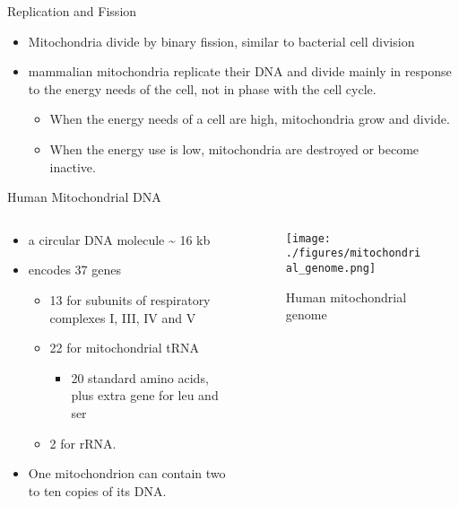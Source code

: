 \documentclass[presentation, smaller]{beamer}
\begin{document}
\begin{frame}[label={sec:org6eeccd4}]{Replication and Fission}
\begin{itemize}
\item Mitochondria divide by binary fission, similar to bacterial cell division

\item mammalian mitochondria replicate their DNA and divide mainly in response
to the energy needs of the cell, not in phase with the cell cycle.
\begin{itemize}
\item When the energy needs of a cell are high, mitochondria grow and
divide.
\item When the energy use is low, mitochondria are destroyed
or become inactive.
\end{itemize}
\end{itemize}
\end{frame}

\begin{frame}[label={sec:org9ac9d02}]{Human Mitochondrial DNA}
\begin{columns}
\begin{column}{.7\columnwidth}
\begin{itemize}
\item a circular DNA molecule \textasciitilde{} 16 kb
\item encodes 37 genes
\begin{itemize}
\item 13 for subunits of respiratory complexes I, III, IV and V
\item 22 for mitochondrial tRNA
\begin{itemize}
\item 20 standard amino acids, plus extra gene for leu and ser
\end{itemize}
\item 2 for rRNA.
\end{itemize}
\item One mitochondrion can contain two to ten copies of its DNA.
\end{itemize}
\end{column}

\begin{column}{.3\columnwidth}
\begin{figure}[htbp]
\centering
\texttt{[image: ./figures/mitochondrial\_genome.png]}
\caption[mtdna]{\label{fig:org6455e12}
Human mitochondrial genome}
\end{figure}
\end{column}
\end{columns}
\end{frame}
\end{document}
